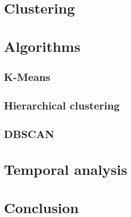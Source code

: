 \documentclass[12pt]{article}
\begin{document}
\section{Clustering}

\section{Algorithms}

\subsection{K-Means}

\subsection{Hierarchical clustering}

\subsection{DBSCAN}

\section{Temporal analysis}

\section{Conclusion}




%
%
%


\end{document}
